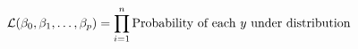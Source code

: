 \documentclass[preview]{standalone}
\begin{document}
\begin{align*}
\special{dvisvgm:raw <g id='unique000'>}\mathcal{L}(\beta_0, \beta_1, \dots, \beta_p)=\prod^n_{i=1}\text{Probability of each }y\text{ under distribution}\special{dvisvgm:raw </g>}
\end{align*}
\end{document}

